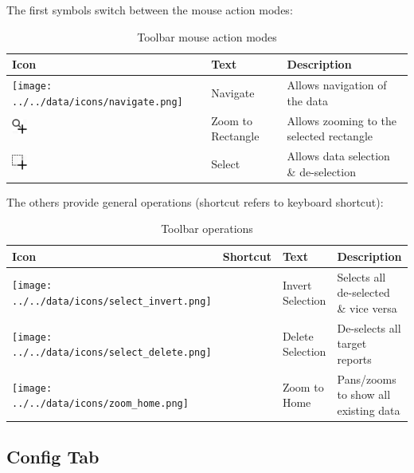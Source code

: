 The first symbols switch between the mouse action modes:

\begin{table}[H]
  \center
  \begin{tabular}{ | l | l | l |}
    \hline
    \textbf{Icon} & \textbf{Text} &  \textbf{Description} \\ \hline
    \texttt{[image: ../../data/icons/navigate.png]} & Navigate & Allows navigation of the data \\ \hline
    \includegraphics[width=0.5cm,frame]{../../data/icons/zoom_select_action.png} & Zoom to Rectangle & Allows zooming to the selected rectangle \\ \hline
    \includegraphics[width=0.5cm,frame]{../../data/icons/select_action.png} & Select & Allows data selection \& de-selection \\ \hline
  \end{tabular}
  \caption{Toolbar mouse action modes}
\end{table}

The others provide general operations (shortcut refers to keyboard shortcut):

\begin{table}[H]
  \center
  \begin{tabular}{ | l | l | l | l |}
    \hline
    \textbf{Icon} & \textbf{Shortcut} &\textbf{Text} &  \textbf{Description} \\ \hline
    \texttt{[image: ../../data/icons/select\_invert.png]} & & Invert Selection & Selects all de-selected \& vice versa \\ \hline
    \texttt{[image: ../../data/icons/select\_delete.png]} & & Delete Selection & De-selects all target reports \\ \hline
    \texttt{[image: ../../data/icons/zoom\_home.png]} & & Zoom to Home & Pans/zooms to show all existing data \\ \hline
  \end{tabular}
  \caption{Toolbar operations}
\end{table} 

\subsection{Config Tab}

